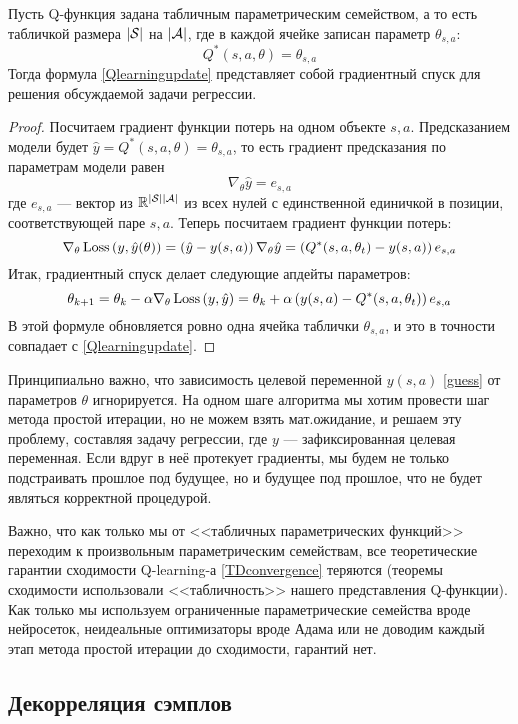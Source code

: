 \begin{theorem}
Пусть Q-функция задана табличным параметрическим семейством, а то есть табличкой размера $|\mathcal{S}|$ на $|\mathcal{A}|$, где в каждой ячейке записан параметр $\theta_{s, a}$:
$$Q^*(s, a, \theta) = \theta_{s, a}$$
Тогда формула \eqref{Qlearningupdate} представляет собой градиентный спуск для решения обсуждаемой задачи регрессии.

\begin{proof}
Посчитаем градиент функции потерь на одном объекте $s, a$. Предсказанием модели будет $\hat{y} = Q^*(s, a, \theta) = \theta_{s, a}$, то есть градиент предсказания по параметрам модели равен
$$\nabla_\theta \hat{y} = e_{s, a}$$
где $e_{s, a}$ --- вектор из $\mathbb{R}^{|\mathcal{S}| |\mathcal{A}|}$ из всех нулей с единственной единичкой в позиции, соответствующей паре $s, a$. Теперь посчитаем градиент функции потерь:
$$\nabla_\theta \operatorname{Loss} \left( y, \hat{y}(\theta) \right) = \left( \hat{y} - y(s, a) \right) \nabla_\theta \hat{y} = \left( Q^*(s, a, \theta_t) - y(s, a) \right) e_{s, a}$$
Итак, градиентный спуск делает следующие апдейты параметров:
$$\theta_{k+1} = \theta_k - \alpha \nabla_\theta \operatorname{Loss} \left( y, \hat{y} \right) = \theta_k + \alpha \left( y(s, a) - Q^*(s, a, \theta_t) \right) e_{s, a}$$
В этой формуле обновляется ровно одна ячейка таблички $\theta_{s, a}$, и это в точности совпадает с \eqref{Qlearningupdate}.
\end{proof}
\end{theorem}

Принципиально важно, что зависимость целевой переменной $y(s, a)$ \eqref{guess} от параметров $\theta$ игнорируется. На одном шаге алгоритма мы хотим провести шаг метода простой итерации, но не можем взять мат.ожидание, и решаем эту проблему, составляя задачу регрессии, где $y$ --- зафиксированная целевая переменная. Если вдруг в неё протекует градиенты, мы будем не только подстраивать прошлое под будущее, но и будущее под прошлое, что не будет являться корректной процедурой.

Важно, что как только мы от <<табличных параметрических функций>> переходим к произвольным параметрическим семействам, все теоретические гарантии сходимости Q-learning-а \ref{TDconvergence} теряются (теоремы сходимости использовали <<табличность>> нашего представления Q-функции). Как только мы используем ограниченные параметрические семейства вроде нейросеток, неидеальные оптимизаторы вроде Адама или не доводим каждый этап метода простой итерации до сходимости, гарантий нет.

\subsection{Декорреляция сэмплов}

